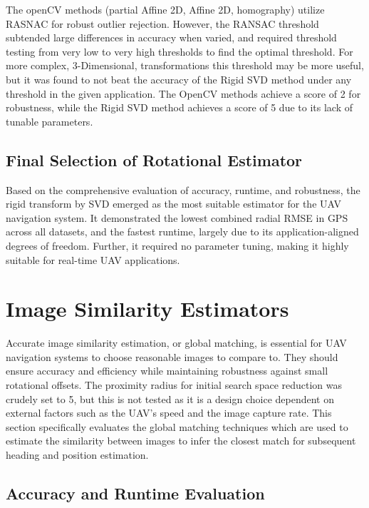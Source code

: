 The openCV methods (partial Affine 2D, Affine 2D, homography) utilize RASNAC for robust outlier rejection. However, the RANSAC threshold subtended large differences in accuracy when varied, and required threshold testing from very low to very high thresholds to find the optimal threshold. For more complex, 3-Dimensional, transformations this threshold may be more useful, but it was found to not beat the accuracy of the Rigid SVD method under any threshold in the given application. The OpenCV methods achieve a score of 2 for robustness, while the Rigid SVD method achieves a score of 5 due to its lack of tunable parameters. 

\subsection{Final Selection of Rotational Estimator}

Based on the comprehensive evaluation of accuracy, runtime, and robustness, the rigid transform by SVD emerged as the most suitable estimator for the UAV navigation system. It demonstrated the lowest combined radial RMSE in GPS across all datasets, and the fastest runtime, largely due to its application-aligned degrees of freedom. Further, it required no parameter tuning, making it highly suitable for real-time UAV applications.





\section{Image Similarity Estimators}

Accurate image similarity estimation, or global matching, is essential for UAV navigation systems to choose reasonable images to compare to. They should ensure accuracy and efficiency while maintaining robustness against small rotational offsets. The proximity radius for initial search space reduction was crudely set to 5, but this is not tested as it is a design choice dependent on external factors such as the UAV's speed and the image capture rate. This section specifically evaluates the global matching techniques which are used to estimate the similarity between images to infer the closest match for subsequent heading and position estimation. 


\subsection{Accuracy and Runtime Evaluation}

